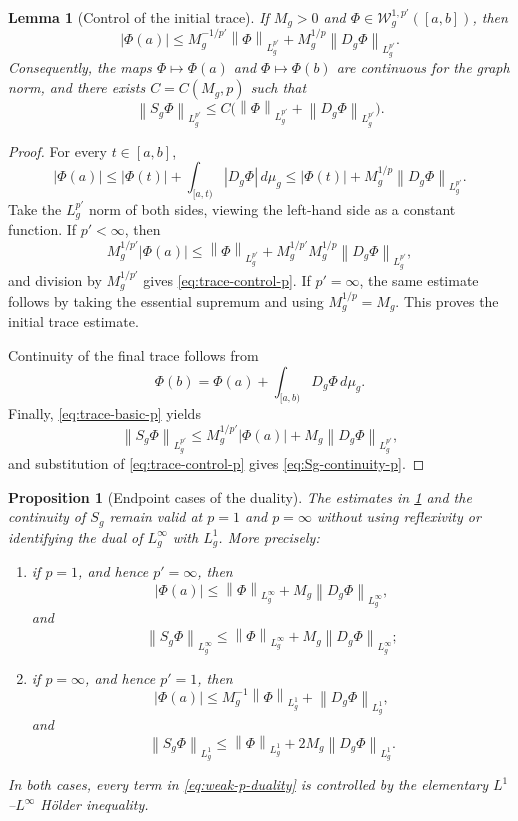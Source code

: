 \documentclass[preprint,12pt]{elsarticle}
\newcommand{\finalrev}[1]{{\color{red}#1}}
\newcommand{\finalrev}[1]{#1}
\newtheorem{proposition}[theorem]{Proposition}
\newtheorem{lemma}[theorem]{Lemma}
\theoremstyle{definition}
\theoremstyle{remark}
\newcommand{\norm}[1]{\left\lVert#1\right\rVert}
\newcommand{\abs}[1]{\left\lvert#1\right\rvert}
\begin{document}
\begin{lemma}[Control of the initial trace]\label{lem:trace-control-p}
If $M_g>0$ and $\Phi\in\mathcal W_g^{1,p'}([a,b])$, then
\begin{equation}\label{eq:trace-control-p}
 \abs{\Phi(a)}
 \le M_g^{-1/p'}\norm{\Phi}_{L_g^{p'}}
      +M_g^{1/p}\norm{D_g\Phi}_{L_g^{p'}}.
\end{equation}
Consequently, the maps $\Phi\mapsto\Phi(a)$ and $\Phi\mapsto\Phi(b)$ are continuous for the graph norm, and there exists $C=C(M_g,p)$ such that
\begin{equation}\label{eq:Sg-continuity-p}
 \norm{S_g\Phi}_{L_g^{p'}}
 \le C\bigl(\norm{\Phi}_{L_g^{p'}}+\norm{D_g\Phi}_{L_g^{p'}}\bigr).
\end{equation}
\end{lemma}

\begin{proof}
For every $t\in[a,b]$,
\[
 \abs{\Phi(a)}
 \le \abs{\Phi(t)}+\int_{[a,t)}\abs{D_g\Phi}\,d\mu_g
 \le \abs{\Phi(t)}+M_g^{1/p}\norm{D_g\Phi}_{L_g^{p'}}.
\]
Take the $L_g^{p'}$ norm of both sides, viewing the left-hand side as a constant function. If $p'<\infty$, then
\[
 M_g^{1/p'}\abs{\Phi(a)}
 \le \norm{\Phi}_{L_g^{p'}}
 +M_g^{1/p'}M_g^{1/p}\norm{D_g\Phi}_{L_g^{p'}},
\]
and division by $M_g^{1/p'}$ gives \eqref{eq:trace-control-p}. If $p'=\infty$, the same estimate follows by taking the \finalrev{essential supremum} and using $M_g^{1/p}=M_g$. This proves the initial trace estimate.

Continuity of the final trace follows from
\[
 \Phi(b)=\Phi(a)+\int_{[a,b)}D_g\Phi\,d\mu_g.
\]
Finally, \eqref{eq:trace-basic-p} yields
\[
 \norm{S_g\Phi}_{L_g^{p'}}
 \le M_g^{1/p'}\abs{\Phi(a)}+M_g\norm{D_g\Phi}_{L_g^{p'}},
\]
and substitution of \eqref{eq:trace-control-p} gives \eqref{eq:Sg-continuity-p}.
\end{proof}

\begin{proposition}[Endpoint cases of the duality]\label{prop:endpoint-duality}
The estimates in \cref{lem:trace-control-p} and the continuity of $S_g$ remain valid at $p=1$ and $p=\infty$ without using reflexivity or identifying the dual of $L_g^\infty$ with $L_g^1$. More precisely:
\begin{enumerate}[label=\roman*)]
 \item if $p=1$, and hence $p'=\infty$, then
 \[
  \abs{\Phi(a)}\le \norm{\Phi}_{L_g^\infty}
      +M_g\norm{D_g\Phi}_{L_g^\infty},
 \]
 and
 \[
  \norm{S_g\Phi}_{L_g^\infty}
  \le \norm{\Phi}_{L_g^\infty}
      +M_g\norm{D_g\Phi}_{L_g^\infty};
 \]
 \item if $p=\infty$, and hence $p'=1$, then
 \[
  \abs{\Phi(a)}\le M_g^{-1}\norm{\Phi}_{L_g^1}
      +\norm{D_g\Phi}_{L_g^1},
 \]
 and
 \[
  \norm{S_g\Phi}_{L_g^1}
  \le \norm{\Phi}_{L_g^1}+2M_g\norm{D_g\Phi}_{L_g^1}.
 \]
\end{enumerate}
In both cases, every term in \eqref{eq:weak-p-duality} is controlled by the elementary $L^1$--$L^\infty$ H\"older inequality.
\end{proposition}
\end{document}
